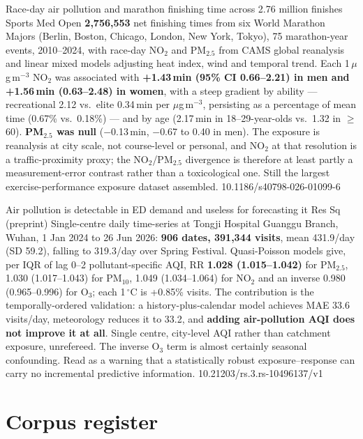 \documentclass[10pt]{article}
\begin{document}
{Race-day air pollution and marathon finishing time across 2.76 million finishes}
{Sports Med Open}
{\textbf{2{,}756{,}553} net finishing times from six World Marathon Majors (Berlin, Boston,
Chicago, London, New York, Tokyo), 75 marathon-year events, 2010--2024, with race-day NO$_2$
and PM$_{2.5}$ from CAMS global reanalysis and linear mixed models adjusting heat index, wind
and temporal trend. Each 1\,$\mu$g\,m$^{-3}$ NO$_2$ was associated with
\textbf{+1.43\,min (95\% CI 0.66--2.21) in men and +1.56\,min (0.63--2.48) in women}, with a
steep gradient by ability --- recreational 2.12 vs.\ elite 0.34\,min per $\mu$g\,m$^{-3}$,
persisting as a percentage of mean time (0.67\% vs.\ 0.18\%) --- and by age
(2.17\,min in 18--29-year-olds vs.\ 1.32 in $\geq$60). \textbf{PM$_{2.5}$ was null}
($-$0.13\,min, $-$0.67 to 0.40 in men). The exposure is reanalysis at city scale, not
course-level or personal, and NO$_2$ at that resolution is a traffic-proximity proxy; the
NO$_2$/PM$_{2.5}$ divergence is therefore at least partly a measurement-error contrast
rather than a toxicological one. Still the largest exercise-performance exposure dataset
assembled.}
{10.1186/s40798-026-01099-6}

{Air pollution is detectable in ED demand and useless for forecasting it}
{Res Sq (preprint)}
{Single-centre daily time-series at Tongji Hospital Guanggu Branch, Wuhan, 1 Jan 2024 to
26 Jun 2026: \textbf{906 dates, 391{,}344 visits}, mean 431.9/day (SD 59.2), falling to
319.3/day over Spring Festival. Quasi-Poisson models give, per IQR of lag 0--2
pollutant-specific AQI, RR \textbf{1.028 (1.015--1.042)} for PM$_{2.5}$,
1.030 (1.017--1.043) for PM$_{10}$, 1.049 (1.034--1.064) for NO$_2$ and an inverse
0.980 (0.965--0.996) for O$_3$; each 1\,$^\circ$C is +0.85\% visits. The contribution is the
temporally-ordered validation: a history-plus-calendar model achieves MAE 33.6 visits/day,
meteorology reduces it to 33.2, and \textbf{adding air-pollution AQI does not improve it at
all}. Single centre, city-level AQI rather than catchment exposure, unrefereed. The inverse
O$_3$ term is almost certainly seasonal confounding. Read as a warning that a statistically
robust exposure--response can carry no incremental predictive information.}
{10.21203/rs.3.rs-10496137/v1}

\clearpage

\section*{\sffamily\bfseries\color{Deep}Corpus register}
\vspace{-1.5mm}{\color{Amber}\rule{\linewidth}{1.1pt}}\vspace{2.5mm}
\end{document}
